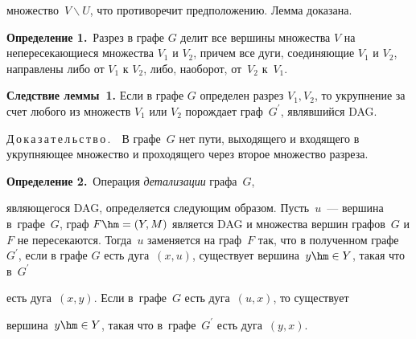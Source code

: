   множество~$ V\backslash U$, что противоречит предположению. Лемма доказана. 


    


  \smallskip


  


  \noindent


  \textbf{Определение 1.}\ Разрез в графе $G$ делит все вершины множества $V$ на непересекающиеся множества $V_1$ и $V_2$, причем все дуги, соединяющие $V_1$ и $V_2$, направлены либо от $V_1$ к $V_2$, либо, наоборот, от~$V_2$ к~$V_1$.


  


  \smallskip


  


  \noindent


  \textbf{Следствие леммы~1.} Если в графе $G$ определен разрез $V_1, V_2$, то укрупнение за счет любого из множеств $V_1$ или $V_2$ порождает граф~$G^\prime$, являвшийся DAG. 


  


  \smallskip


  


  \noindent


  Д\,о\,к\,а\,з\,а\,т\,е\,л\,ь\,с\,т\,в\,о\,.\ \ В графе~$G$ нет пути, выходящего и входящего в укрупняющее множество и проходящего через второе множество разреза. 


  


  


  \smallskip


  


  \noindent


  \textbf{Определение 2.}\ Операция \textit{детализации} графа~$G$,


   являющегося DAG, определяется следующим образом. Пусть~$u$~--- вершина в~графе~$G$, граф $F\hm = (Y, M)$ является DAG и множества вершин графов~$G$ и $F$ не пересекаются. Тогда~$u$ заменяется на граф~$F$ так, что в полученном графе~$G^\prime$, если в графе $G$ есть дуга~$(x, u)$, существует вершина~$y\hm \in Y$, такая что в~$G^\prime$ 


   есть дуга~$(x, y)$. Если в~графе~$G$ есть дуга~$(u, x)$, то существует 


   вершина~$y\hm\in Y$, такая что в~графе~$G^\prime$ есть дуга~$(y, x)$. 


